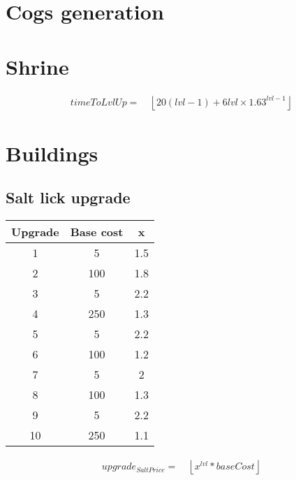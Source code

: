     \section{Cogs generation}
    \section{Shrine}
        \begin{align*}
            timeToLvlUp = &\ \left\lfloor 20(lvl-1)+6lvl \times 1.63^{lvl-1}\right\rfloor 
        \end{align*}
    \section{Buildings}
        \subsection{Salt lick upgrade}
            \begin{center}
                \begin{tabular}{ ccc } 
                    Upgrade & Base cost & x
                    \\
                    \hline
                    1 & 5 & 1.5 \\ 
                    2 & 100 & 1.8 \\ 
                    3 & 5 & 2.2 \\
                    4 & 250 & 1.3 \\ 
                    5 & 5 & 2.2 \\ 
                    6 & 100 & 1.2 \\
                    7 & 5 & 2 \\ 
                    8 & 100 & 1.3 \\ 
                    9 & 5 & 2.2 \\
                    10 & 250 & 1.1 \\
                \end{tabular}
            \end{center}
            \begin{align*}
                upgrade_{SaltPrice} = &\ \left\lfloor x^{lvl} * baseCost \right\rfloor 
            \end{align*}